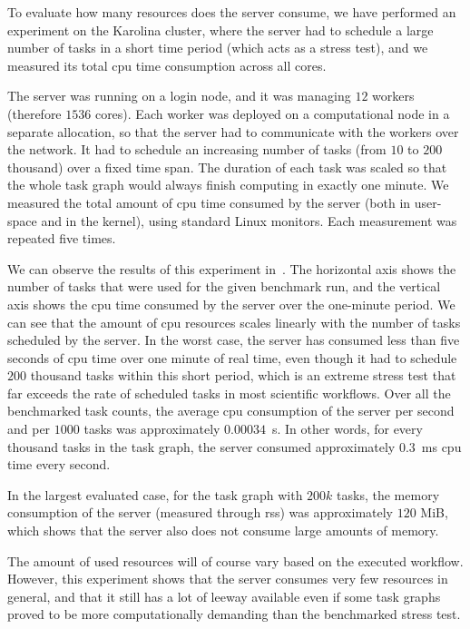 To evaluate how many resources does the server consume, we have performed an experiment on the
Karolina cluster, where the server had to schedule a large number of tasks in a short time period
(which acts as a stress test), and we measured its total \gls{cpu} time consumption
across all cores.

The server was running on a login node, and it was managing $12$ workers
(therefore $1536$ cores). Each worker was deployed on a computational node in a
separate allocation, so that the server had to communicate with the workers over the network. It
had to schedule an increasing number of tasks (from $10$ to
$200$ thousand) over a fixed time span. The duration of each task was scaled so
that the whole task graph would always finish computing in exactly one minute. We measured the
total amount of \gls{cpu} time consumed by the server (both in user-space and in the
kernel), using standard Linux monitors. Each measurement was repeated five times.

We can observe the results of this experiment in~. The horizontal axis shows
the number of tasks that were used for the given benchmark run, and the vertical axis shows the
\gls{cpu} time consumed by the server over the one-minute period. We can see that the
amount of \gls{cpu} resources scales linearly with the number of tasks scheduled by
the server. In the worst case, the server has consumed less than five seconds of
\gls{cpu} time over one minute of real time, even though it had to schedule
$200$ thousand tasks within this short period, which is an extreme stress test
that far exceeds the rate of scheduled tasks in most scientific workflows. Over all the benchmarked
task counts, the average \gls{cpu} consumption of the server per second and per
$1000$ tasks was approximately $0.00034$~s. In other words, for every
thousand tasks in the task graph, the server consumed approximately $0.3$~ms
\gls{cpu} time every second.

In the largest evaluated case, for the task graph with $200k$ tasks, the memory
consumption of the server (measured through \gls{rss}) was approximately
$120$ MiB, which shows that the server also does not consume large amounts of
memory.

The amount of used resources will of course vary based on the executed workflow. However, this
experiment shows that the server consumes very few resources in general, and that it still has a
lot of leeway available even if some task graphs proved to be more computationally demanding than
the benchmarked stress test.

